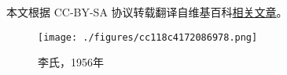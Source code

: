 
本文根据 CC-BY-SA 协议转载翻译自维基百科\href{https://en.wikipedia.org/wiki/Tsung-Dao_Lee}{相关文章}。

\begin{figure}[ht]
\centering
\texttt{[image: ./figures/cc118c4172086978.png]}
\caption{李氏，1956年} \label{fig_Tsung_1}
\end{figure}

